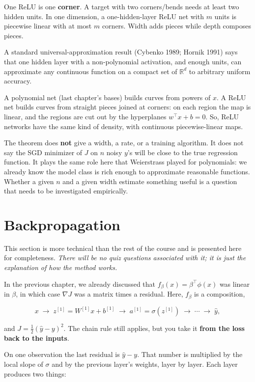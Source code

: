 \documentclass[
]{book}
\begin{document}
One ReLU is one \textbf{corner}. A target with two corners/bends needs at least two hidden units. In one dimension, a one-hidden-layer ReLU net with \(m\) units is piecewise linear with at most \(m\) corners. Width adds pieces while depth composes pieces.

A standard universal-approximation result (Cybenko 1989; Hornik 1991) says that one hidden layer with a non-polynomial activation, and enough units, can approximate any continuous function on a compact set of \(\mathbb{R}^d\) to arbitrary uniform accuracy.

A polynomial net (last chapter's bases) builds curves from powers of \(x\). A ReLU net builds curves from straight pieces joined at corners: on each region the map is linear, and the regions are cut out by the hyperplanes \(w^\top x+b=0\). So, ReLU networks have the same kind of density, with continuous piecewise-linear maps.

The theorem does \textbf{not} give a width, a rate, or a training algorithm. It does not say the SGD minimizer of \(J\) on \(n\) noisy \(y\)'s will be close to the true regression function. It plays the same role here that Weierstrass played for polynomials: we already know the model class is rich enough to approximate reasonable functions. Whether a given \(n\) and a given width estimate something useful is a question that needs to be investigated empirically.

\section{Backpropagation}\label{backpropagation}

This section is more technical than the rest of the course and is presented here for completeness. \emph{There will be no quiz questions associated with it; it is just the explanation of how the method works.}

In the previous chapter, we already discussed that \(f_\beta(x)=\beta^\top\phi(x)\) was linear in \(\beta\), in which case \(\nabla J\) was a matrix times a residual. Here, \(f_\beta\) is a composition,

\[
x \;\to\; z^{[1]}=W^{[1]}x+b^{[1]} \;\to\; a^{[1]}=\sigma(z^{[1]}) \;\to\; \cdots \;\to\; \hat y,
\]

and \(J=\frac12(\hat y-y)^2\). The chain rule still applies, but you take it \textbf{from the loss back to the inputs}.

On one observation the last residual is \(\hat y-y\). That number is multiplied by the local slope of \(\sigma\) and by the previous layer's weights, layer by layer. Each layer produces two things:
\end{document}
